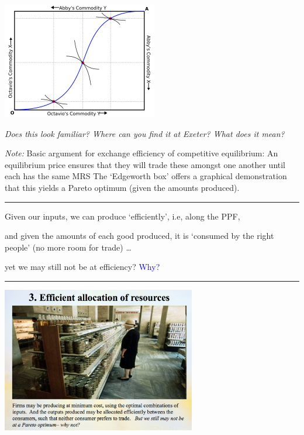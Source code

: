 \documentclass[]{article}
\begin{document}
\includegraphics[height=2in]{picsfigs/Contract-curve-on-edgeworth-box.png}

\bigskip

\emph{Does this look familiar? Where can you find it at Exeter? What does it mean?}

\emph{Note:}
Basic argument for exchange efficiency of competitive equilibrium:
An equilibrium price ensures that they will trade these amongst one another until each has the same MRS
The `Edgeworth box' offers a graphical demonstration that this yields a Pareto optimum (given the amounts produced).

\begin{center}\rule{0.5\linewidth}{\linethickness}\end{center}

Given our inputs, we can produce `efficiently', i.e, along the PPF,

and given the amounts of each good produced, it is `consumed by the right people' (no more room for trade) \ldots{}

yet we may still not be at efficiency? \textcolor{blue}{Why?}

\begin{center}\rule{0.5\linewidth}{\linethickness}\end{center}

\includegraphics[height=2.5in]{picsfigs/toplevelefficiency.png}
\end{document}
